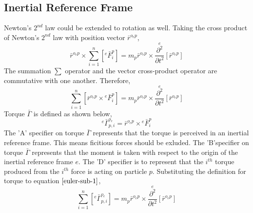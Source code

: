 \subsection{Inertial Reference Frame}
\label{Eulerslaw inertial ref frame point particle section}
\begin{comment}
\end{comment}
Newton's $2^{nd}$ law could be extended to rotation as well. 
Taking the cross product of Newton's $2^{nd}$ law with position vector $\bar{r}^{o_{e}p}$,
$$\bar{r}^{o_{e}p}\times\sum^{n}_{i = 1}\left[{}^{e}\bar{F}^{p}_{i}\right] = m_{p}\bar{r}^{o_{e}p}\times\overset{e}{\frac{\partial^{2}}{\partial t^{2}}}[\bar{r}^{o_{e}p}]$$
The summation $\displaystyle\sum$ operator and the vector cross-product operator are commutative with one another. 
Therefore,
\begin{equation}\sum^{n}_{i = 1}\left[\bar{r}^{o_{e}p}\times{}^{e}\bar{F}^{p}_{i}\right] = m_{p}\bar{r}^{o_{e}p}\times\overset{e}{\frac{\partial^{2}}{\partial t^{2}}}[\bar{r}^{o_{e}p}]\label{euler-sub-1}\end{equation}
Torque $\bar{\Gamma}$ is defined as shown below,
\begin{equation}
{}^{e}\bar{\Gamma}^{o_{e}}_{p,i} = \bar{r}^{o_{e}p}\times{}^{e}\bar{F}^{p}_{i}
\label{torque-definition}
\end{equation}
The 'A' specifier on torque $\bar{\Gamma}$ represents that the torque is perceived in an inertial reference frame. 
This means ficitious forces should be exluded. 
The 'B'specifier on torque $\bar{\Gamma}$ represents that the moment is taken with respect to the origin of the inertial reference frame $e$. 
The 'D' specifier is to represent that the $i^{th}$ torque produced from the $i^{th}$ force is acting on particle $p$. 
Substituting the definition for torque to equation $\ref{euler-sub-1}$,
\begin{equation}\sum^{n}_{i = 1}\left[{}^{e}\bar{\Gamma}^{o_{e}}_{p,i}\right] = m_{p}\bar{r}^{o_{e}p}\times\overset{e}{\frac{\partial^{2}}{\partial t^{2}}}[\bar{r}^{o_{e}p}]\label{euler-sub-2}\end{equation}

